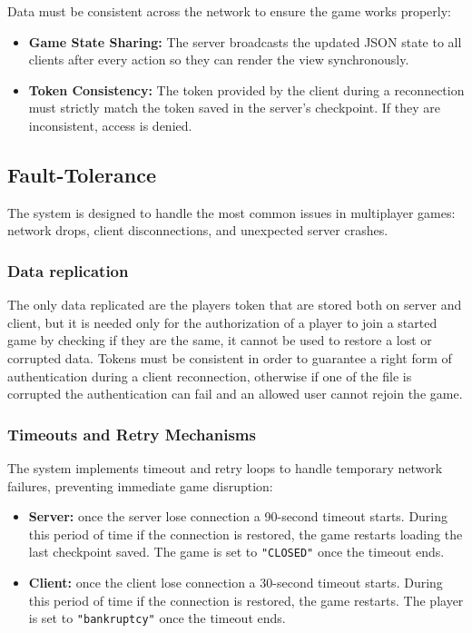 \documentclass{scrartcl}
\begin{document}
Data must be consistent across the network to ensure the game works properly:
\begin{itemize}
    \item \textbf{Game State Sharing:} The server broadcasts the updated JSON state to all clients after every action so they can render the view synchronously.
    \item \textbf{Token Consistency:} The token provided by the client during a reconnection must strictly match the token saved in the server's checkpoint. If they are inconsistent, access is denied.
\end{itemize}


\subsection{Fault-Tolerance}\label{fault-tolerance}
The system is designed to handle the most common issues in multiplayer games: network drops, client disconnections, and unexpected server crashes.
\subsubsection{Data replication}
The only data replicated are the players token that are stored both on server and client, but it is needed only for
the authorization of a player to join a started game by checking if they are the same,
it cannot be used to restore a lost or corrupted data.
Tokens must be consistent in order to guarantee a right form of authentication during a client reconnection,
otherwise if one of the file is corrupted the authentication can fail and an allowed user cannot rejoin the game.

\subsubsection{Timeouts and Retry Mechanisms}\label{recovery}
The system implements timeout and retry loops to handle temporary network failures, preventing immediate game disruption:
\begin{itemize}
    \item \textbf{Server:} once the server lose connection a 90-second timeout starts.
    During this period of time if the connection is restored, the game restarts loading the last checkpoint saved.
    The game is set to \texttt{"CLOSED"} once the timeout ends.
    \item \textbf{Client:} once the client lose connection a 30-second timeout starts.
    During this period of time if the connection is restored, the game restarts.
    The player is set to \texttt{"bankruptcy"} once the timeout ends.
\end{itemize}
\end{document}
